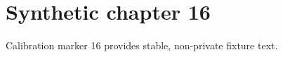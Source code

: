 \chapter{Synthetic chapter 16}\label{chap:16}
Calibration marker 16 provides stable, non-private fixture text.
